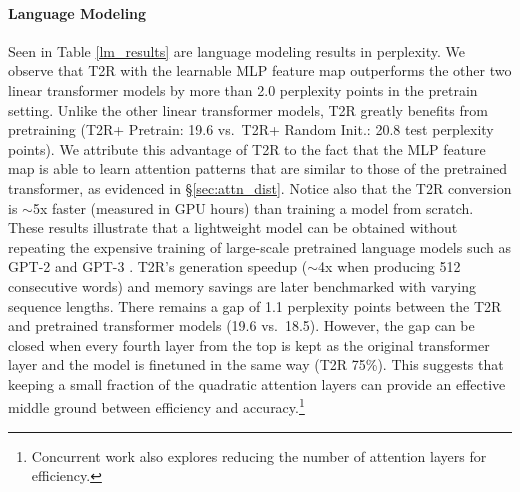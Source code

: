 \documentclass[11pt]{article}
\newcommand{\TRNN}{T2R\xspace}
\begin{document}
\paragraph{Language Modeling}
Seen in Table \ref{lm_results} are language modeling results in perplexity.
We observe that \TRNN with the learnable MLP feature map outperforms the other two linear transformer models by more than 2.0 perplexity points in the pretrain setting.
Unlike the other linear transformer models, \TRNN greatly benefits from pretraining (\TRNN + Pretrain: 19.6 vs.\ \TRNN + Random Init.: 20.8 test perplexity points).
We attribute this advantage of \TRNN to the fact that the MLP feature map is able to learn attention patterns that are similar to those of the pretrained transformer,
as evidenced in \S\ref{sec:attn_dist}.
Notice also that the \TRNN conversion is $\sim$5x faster (measured in GPU hours) than training a model from scratch.
These results illustrate that a lightweight model can be obtained without repeating the expensive training of large-scale pretrained language models such as GPT-2 and GPT-3 \cite{gpt2, gpt3}.
\TRNN's generation speedup ($\sim$4x when producing 512 consecutive words) and memory savings are later benchmarked with varying sequence lengths.
There remains a gap of 1.1 perplexity points between the \TRNN and pretrained transformer models (19.6 vs.\ 18.5).
However, the gap can be closed when every fourth layer from the top is kept as the original transformer layer and the model is finetuned in the same way (\TRNN 75\%). 
This suggests that keeping a small fraction of the quadratic attention layers can provide an effective middle ground between efficiency and accuracy.\footnote{Concurrent work \cite{attention-meets} also explores reducing the number of attention layers for efficiency.}
\end{document}
